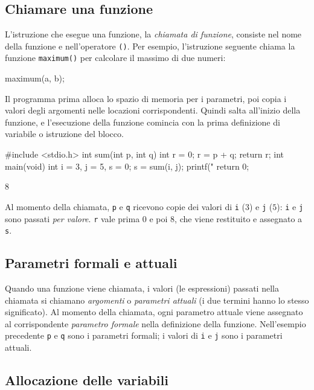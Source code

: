\documentclass[11pt,a4paper]{article}
\begin{document}
\subsection{Chiamare una funzione}

L'istruzione che esegue una funzione, la \emph{chiamata di funzione}, consiste nel nome della funzione e nell'operatore \lstinline|()|. Per esempio, l'istruzione seguente chiama la funzione \lstinline|maximum()| per calcolare il massimo di due numeri:
\begin{codice}
maximum(a, b);
\end{codice}
Il programma prima alloca lo spazio di memoria per i parametri, poi copia i valori degli argomenti nelle locazioni corrispondenti. Quindi salta all'inizio della funzione, e l'esecuzione della funzione comincia con la prima definizione di variabile o istruzione del blocco.

\begin{esempio}
\begin{codice}
#include <stdio.h>
int sum(int p, int q) {
    int r = 0;
    r = p + q;
    return r;
}
int main(void) {
    int i = 3, j = 5, s = 0;
    s = sum(i, j);
    printf("%
    return 0;
}
\end{codice}
\begin{risultato}
8
\end{risultato}
Al momento della chiamata, \lstinline|p| e \lstinline|q| ricevono copie dei valori di \lstinline|i| ($3$) e \lstinline|j| ($5$): \lstinline|i| e \lstinline|j| sono passati \emph{per valore}. \lstinline|r| vale prima $0$ e poi $8$, che viene restituito e assegnato a \lstinline|s|.
\end{esempio}

\subsection{Parametri formali e attuali}

Quando una funzione viene chiamata, i valori (le espressioni) passati nella chiamata si chiamano \emph{argomenti} o \emph{parametri attuali} (i due termini hanno lo stesso significato). Al momento della chiamata, ogni parametro attuale viene assegnato al corrispondente \emph{parametro formale} nella definizione della funzione. Nell'esempio precedente \lstinline|p| e \lstinline|q| sono i parametri formali; i valori di \lstinline|i| e \lstinline|j| sono i parametri attuali.

\subsection{Allocazione delle variabili}
\end{document}
